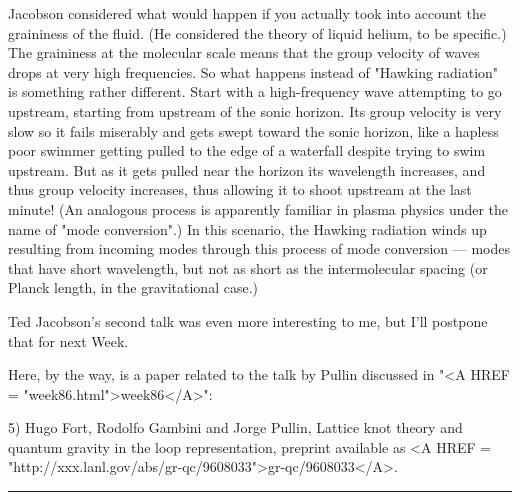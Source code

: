 Jacobson considered what would happen if you actually took into
account the graininess of the fluid.  (He considered the theory of
liquid helium, to be specific.)  The graininess at the molecular scale
means that the group velocity of waves drops at very high frequencies.
So what happens instead of "Hawking radiation" is something rather
different.  Start with a high-frequency wave attempting to go
upstream, starting from upstream of the sonic horizon.  Its group
velocity is very slow so it fails miserably and gets swept toward the
sonic horizon, like a hapless poor swimmer getting pulled to the edge
of a waterfall despite trying to swim upstream.  But as it gets pulled
near the horizon its wavelength increases, and thus group velocity
increases, thus allowing it to shoot upstream at the last minute!  (An
analogous process is apparently familiar in plasma physics under the
name of "mode conversion".)  In this scenario, the Hawking radiation
winds up resulting from incoming modes through this process of mode
conversion --- modes that have short wavelength, but not as short as
the intermolecular spacing (or Planck length, in the gravitational case.)

Ted Jacobson's second talk was even more interesting to me, but
I'll postpone that for next Week.

Here, by the way, is a paper related to the talk by Pullin discussed in 
"<A HREF = "week86.html">week86</A>":

5) Hugo Fort, Rodolfo Gambini and Jorge Pullin, Lattice knot theory
and quantum gravity in the loop representation, preprint available as
<A HREF = "http://xxx.lanl.gov/abs/gr-qc/9608033">gr-qc/9608033</A>.

\par\noindent\rule{\textwidth}{0.4pt}

